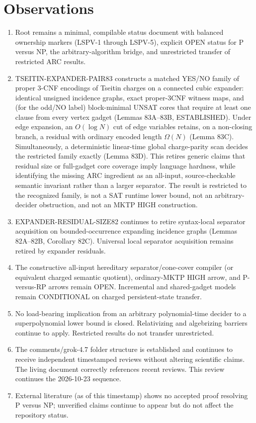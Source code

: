 \documentclass[11pt]{article}
\begin{document}
\section{Observations}
\begin{enumerate}
\item Root  remains a minimal, compilable status document with balanced ownership markers (LSPV-1 through LSPV-5), explicit OPEN status for P versus NP, the arbitrary-algorithm bridge, and unrestricted transfer of restricted ARC results.
\item TSEITIN-EXPANDER-PAIR83 constructs a matched YES/NO family of proper 3-CNF encodings of Tseitin charges on a connected cubic expander: identical unsigned incidence graphs, exact proper-3CNF witness maps, and (for the odd/NO label) block-minimal UNSAT cores that require at least one clause from every vertex gadget (Lemmas 83A--83B, ESTABLISHED). Under edge expansion, an $O(\log N)$ cut of edge variables retains, on a non-closing branch, a residual with ordinary encoded length $\Omega(N)$ (Lemma 83C). Simultaneously, a deterministic linear-time global charge-parity scan decides the restricted family exactly (Lemma 83D). This retires generic claims that residual size or full-gadget core coverage imply language hardness, while identifying the missing ARC ingredient as an all-input, source-checkable semantic invariant rather than a larger separator. The result is restricted to the recognized family, is not a SAT runtime lower bound, not an arbitrary-decider obstruction, and not an MKTP HIGH construction.
\item EXPANDER-RESIDUAL-SIZE82 continues to retire syntax-local separator acquisition on bounded-occurrence expanding incidence graphs (Lemmas 82A--82B, Corollary 82C). Universal local separator acquisition remains retired by expander residuals.
\item The constructive all-input hereditary separator/cone-cover compiler (or equivalent charged semantic quotient), ordinary-MKTP HIGH arrow, and P-versus-RP arrows remain OPEN. Incremental and shared-gadget models remain CONDITIONAL on charged persistent-state transfer.
\item No load-bearing implication from an arbitrary polynomial-time decider to a superpolynomial lower bound is closed. Relativizing and algebrizing barriers continue to apply. Restricted results do not transfer unrestricted.
\item The comments/grok-4.7 folder structure is established and continues to receive independent timestamped reviews without altering scientific claims. The living document correctly references recent reviews. This review continues the 2026-10-23 sequence.
\item External literature (as of this timestamp) shows no accepted proof resolving P versus NP; unverified claims continue to appear but do not affect the repository status.
\end{enumerate}
\end{document}
